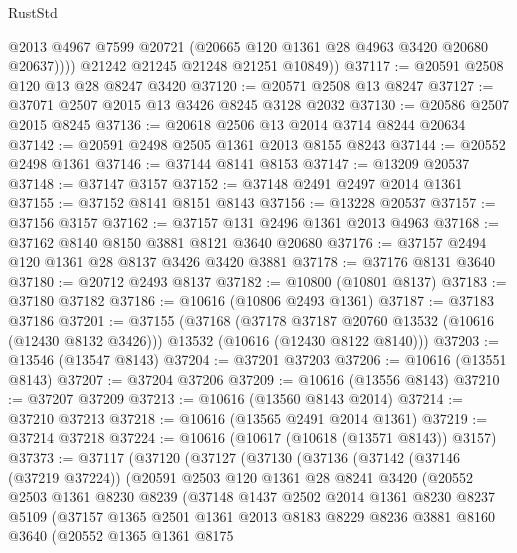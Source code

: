 \begin{lexlean}{RustStd}
\begin{coremodule}
              @2013
              @4967
              @7599
              @20721
              (@20665 @120 @1361 @28 @4963 @3420 @20680 @20637))))
        @21242
        @21245
        @21248
        @21251
        @10849))
@37117 := @20591 @2508 @120 @13 @28 @8247 @3420
@37120 := @20571 @2508 @13 @8247
@37127 := @37071 @2507 @2015 @13 @3426 @8245 @3128 @2032
@37130 := @20586 @2507 @2015 @8245
@37136 := @20618 @2506 @13 @2014 @3714 @8244 @20634
@37142 := @20591 @2498 @2505 @1361 @2013 @8155 @8243
@37144 := @20552 @2498 @1361
@37146 := @37144 @8141 @8153
@37147 := @13209 @20537
@37148 := @37147 @3157
@37152 := @37148 @2491 @2497 @2014 @1361
@37155 := @37152 @8141 @8151 @8143
@37156 := @13228 @20537
@37157 := @37156 @3157
@37162 := @37157 @131 @2496 @1361 @2013 @4963
@37168 := @37162 @8140 @8150 @3881 @8121 @3640 @20680
@37176 := @37157 @2494 @120 @1361 @28 @8137 @3426 @3420 @3881
@37178 := @37176 @8131 @3640
@37180 := @20712 @2493 @8137
@37182 := @10800 (@10801 @8137)
@37183 := @37180 @37182
@37186 := @10616 (@10806 @2493 @1361)
@37187 := @37183 @37186
@37201 := @37155
    (@37168
      (@37178 @37187 @20760 @13532 (@10616 (@12430 @8132 @3426)))
      @13532
      (@10616 (@12430 @8122 @8140)))
@37203 := @13546 (@13547 @8143)
@37204 := @37201 @37203
@37206 := @10616 (@13551 @8143)
@37207 := @37204 @37206
@37209 := @10616 (@13556 @8143)
@37210 := @37207 @37209
@37213 := @10616 (@13560 @8143 @2014)
@37214 := @37210 @37213
@37218 := @10616 (@13565 @2491 @2014 @1361)
@37219 := @37214 @37218
@37224 := @10616 (@10617 (@10618 (@13571 @8143)) @3157)
@37373 := @37117
    (@37120
      (@37127
        (@37130
          (@37136
            (@37142
              (@37146 (@37219 @37224))
              (@20591
                @2503
                @120
                @1361
                @28
                @8241
                @3420
                (@20552
                  @2503
                  @1361
                  @8230
                  @8239
                  (@37148
                    @1437
                    @2502
                    @2014
                    @1361
                    @8230
                    @8237
                    @5109
                    (@37157
                      @1365
                      @2501
                      @1361
                      @2013
                      @8183
                      @8229
                      @8236
                      @3881
                      @8160
                      @3640
                      (@20552
                        @1365
                        @1361
                        @8175

\end{coremodule}
\end{lexlean}
